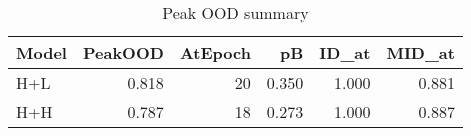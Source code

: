 \begin{table}[t]
\centering
\begin{tabular}{lrrrrr}
\hline
Model & PeakOOD & AtEpoch & pB & ID_at & MID_at \\
\hline
H+L & 0.818 & 20 & 0.350 & 1.000 & 0.881 \\
H+H & 0.787 & 18 & 0.273 & 1.000 & 0.887 \\
\hline
\end{tabular}
\caption{Peak OOD summary}
\label{tab:peak}
\end{table}
